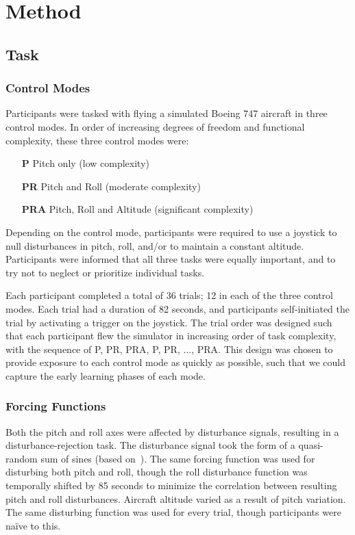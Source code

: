 \section{Method}
\subsection{Task}
\subsubsection{Control Modes}
Participants were tasked with flying a simulated Boeing 747 aircraft in three control modes. In order of increasing degrees of freedom and functional complexity, these three control modes were:
\begin{itemize}
    \item[\textbf{P}] Pitch only (low complexity)
    \item[\textbf{PR}] Pitch and Roll (moderate complexity)
    \item[\textbf{PRA}] Pitch, Roll and Altitude (significant complexity)
\end{itemize}
Depending on the control mode, participants were required to use a joystick to null disturbances in pitch, roll, and/or to maintain a constant altitude.
Participants were informed that all three tasks were equally important, and to try not to neglect or prioritize individual tasks.

Each participant completed a total of 36 trials; 12 in each of the three control modes.
Each trial had a duration of 82 seconds, and participants self-initiated the trial by activating a trigger on the joystick.
The trial order was designed such that each participant flew the simulator in increasing order of task complexity, with the sequence of P, PR, PRA, P, PR, $\ldots$, PRA.
This design was chosen to provide exposure to each control mode as quickly as possible, such that we could capture the early learning phases of each mode.

\subsubsection{Forcing Functions}
Both the pitch and roll axes were affected by disturbance signals, resulting in a disturbance-rejection task.
The disturbance signal took the form of a quasi-random sum of sines (based on~\citet{doi:10.2514/1.39953}).
The same forcing function was used for disturbing both pitch and roll, though the roll disturbance function was temporally shifted by 85 seconds to minimize the correlation between resulting pitch and roll disturbances.
Aircraft altitude varied as a result of pitch variation.
The same disturbing function was used for every trial, though participants were naïve to this.

